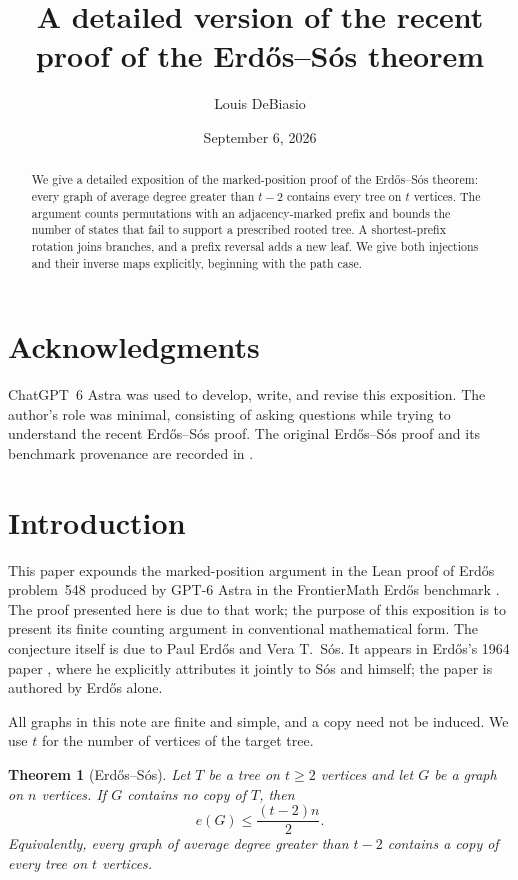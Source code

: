 \documentclass[11pt]{article}
\title{A detailed version of the recent proof of the Erd\H{o}s--S\'os theorem}
\author{Louis DeBiasio}
\date{September 6, 2026}
\numberwithin{equation}{section}
\newtheorem{theorem}{Theorem}[section]
\theoremstyle{definition}
\begin{document}
\maketitle

\begin{abstract}
We give a detailed exposition of the marked-position proof of the
Erd\H{o}s--S\'os theorem: every graph of average degree greater than $t-2$
contains every tree on $t$ vertices.  The argument counts permutations
with an adjacency-marked prefix and bounds the number of states that
fail to support a prescribed rooted tree.  A shortest-prefix rotation
joins branches, and a prefix reversal adds a new leaf.  We give both
injections and their inverse maps explicitly, beginning with the path case.
\end{abstract}

\section*{Acknowledgments}
ChatGPT~6 Astra was used to develop, write, and revise this exposition.
The author's role was minimal, consisting of asking questions while
trying to understand the recent Erd\H{o}s--S\'os proof.
The original Erd\H{o}s--S\'os proof and its benchmark provenance are
recorded in \cite{AdamczewskiBloom2026,Erdos548Repository}.

\section{Introduction}

This paper expounds the marked-position argument in the Lean proof of
Erd\H{o}s problem~548 produced by GPT-6 Astra in the FrontierMath
Erd\H{o}s benchmark \cite{AdamczewskiBloom2026,Erdos548Repository}.
The proof presented here is due to that work; the purpose of this exposition
is to present its finite counting argument in conventional mathematical form.
The conjecture itself is due to Paul Erd\H{o}s and Vera T.~S\'os.
It appears in Erd\H{o}s's 1964 paper \cite[p.~30]{Erdos1964}, where he
explicitly attributes it jointly to S\'os and himself; the paper is authored
by Erd\H{o}s alone.

All graphs in this note are finite and simple, and a copy need not be
induced.  We use $t$ for the number of vertices of the target tree.

\begin{theorem}[Erd\H{o}s--S\'os]\label{thm:ES}
Let $T$ be a tree on $t\geq 2$ vertices and let $G$ be a graph on $n$
vertices.  If $G$ contains no copy of $T$, then
\[
        e(G)\leq \frac{(t-2)n}{2}.
\]
Equivalently, every graph of average degree greater than $t-2$ contains a
copy of every tree on $t$ vertices.
\end{theorem}
\end{document}
